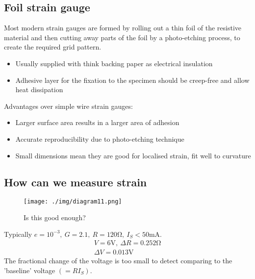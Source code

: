 \subsection{Foil strain gauge}
Most modern strain gauges are formed by rolling out a thin foil of the resistive material and then cutting away parts of the foil by a photo-etching process, to create the required grid pattern.
\begin{itemize}
  \item Usually supplied with think backing paper as electrical insulation
  \item Adhesive layer for the fixation to the specimen should be creep-free and allow heat dissipation
\end{itemize}
Advantages over simple wire strain gauges:
\begin{itemize}
  \item Larger surface area results in a larger area of adhesion
  \item Accurate reproducibility due to photo-etching technique
  \item Small dimensions mean they are good for localised strain, fit well to curvature
\end{itemize}
\subsection{How can we measure strain}
\begin{figure}[H]
  \centering
  \texttt{[image: ./img/diagram11.png]}
  \caption{Is this good enough?}
\end{figure}
Typically $e = 10^{-3}, \ G = 2.1, \ R = 120 \si{\ohm}, \ I_S < 50 \si{\milli \ampere}$.
\begin{gather}
  V = 6 \si{\volt}, \ \Delta R = 0.252 \si{\ohm}\\
  \Delta V = 0.013 \si{\volt}
\end{gather}
The fractional change of the voltage is too small to detect comparing to the 'baseline' voltage $(=RI_S)$.
